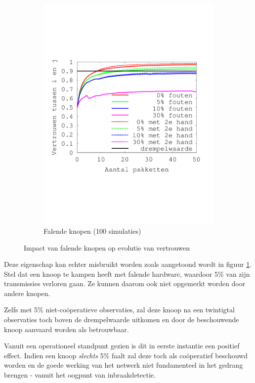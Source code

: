 \begin{figure}[ht]
\begin{subfigure}{.49\textwidth}
  \includegraphics[width=\linewidth]{./resources/reputation-with-failure.pdf}
  \caption{Falende knopen (100 simulaties)}
  \label{fig:reputation-with-failure}
\end{subfigure}
\caption{Impact van falende knopen op evolutie van vertrouwen}
\label{fig:reputation-paper-with-failure}
\end{figure}

Deze eigenschap kan echter misbruikt worden zoals aangetoond wordt in figuur
\ref{fig:reputation-with-failure}. Stel dat een knoop te kampen heeft met
falende hardware, waardoor 5\% van zijn transmissies verloren gaan. Ze kunnen
daarom ook niet opgemerkt worden door andere knopen.

Zelfs met 5\% niet-co\"operatieve observaties, zal deze knoop na een twintigtal
observaties toch boven de drempelwaarde uitkomen en door de beschouwende knoop
aanvaard worden als betrouwbaar.

Vanuit een operationeel standpunt gezien is dit in eerste instantie een
positief effect. Indien een knoop \emph{slechts} 5\% faalt zal deze toch als
co\"operatief beschouwd worden en de goede werking van het netwerk niet
fundamenteel in het gedrang brengen - vanuit het oogpunt van inbraakdetectie.


